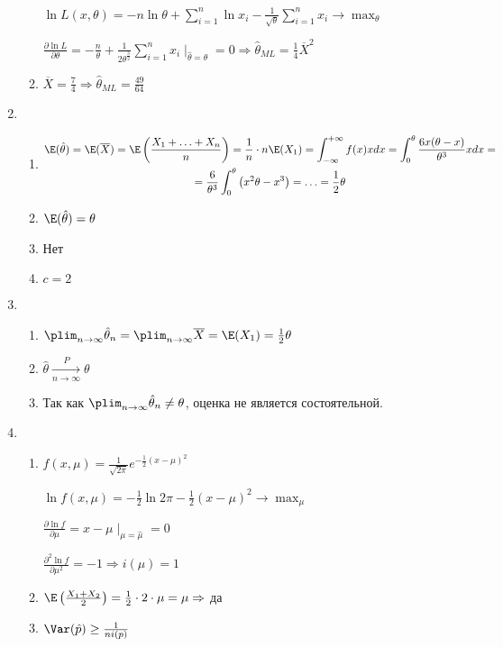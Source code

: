 \begin{enumerate}
\begin{enumerate}
$\ln L(x, \theta) = -n \ln \theta + \sum_{i=1}^n \ln x_i - \frac{1}{\sqrt{\theta}} \sum_{i=1}^n x_i \to \max_\theta $

$\frac{\partial \ln L}{\partial \theta} = -\frac{n}{\theta} + \frac{1}{2\theta^{\frac{3}{2}}} \sum_{i=1}^{n} x_i \mid_{\hat{\theta} = \theta} =0 \Rightarrow \hat{\theta}_{ML} = \frac{1}{4} \overline{X}^2$

\item $\overline{X} = \frac{7}{4} \Rightarrow \hat{\theta}_{ML} = \frac{49}{64}$
\end{enumerate}

\item
\begin{enumerate}
\item
\begin{multline*}
\E(\hat{\theta}) = \E(\overline{X}) = \E \left(\frac{X_1+\ldots+X_n}{n} \right) = \frac{1}{n} \cdot n \E(X_1) = \int_{-\infty}^{+\infty} f(x)x dx = \int_{0}^{\theta} \frac{6x(\theta-x)}{\theta^3} x dx = \\
= \frac{6}{\theta^3} \int_{0}^{\theta} \left( x^2\theta - x^3\right) = \ldots = \frac{1}{2} \theta
\end{multline*}
\item $\E(\hat{\theta}) = \theta$
\item Нет
\item $c=2$
\end{enumerate}

\item
\begin{enumerate}
\item $\plim_{n\to\infty} \hat{\theta}_n = \plim_{n\to\infty} \overline{X} = \E(X_1) = \frac{1}{2}\theta$
\item $\hat{\theta} \underset{n \to \infty}{\overset{P}{\to}} \theta$
\item Так как $\plim_{n\to\infty} \hat{\theta}_n \not= \theta$, оценка не является состоятельной.
\end{enumerate}

\item
\begin{enumerate}
\item $f(x, \mu) =  \frac{1}{\sqrt{2 \pi}} e^{-\frac{1}{2} (x - \mu)^2}$

$\ln f(x, \mu) = -\frac{1}{2} \ln 2\pi -\frac{1}{2}(x - \mu)^2 \to \max_\mu$

$\frac{\partial \ln f}{\partial \mu} = x - \mu \mid_{\mu=\hat{\mu}} =0 $

$\frac{\partial^2 \ln f}{\partial \mu^2} = -1 \Rightarrow i(\mu) = 1$
\item $\E\left(\frac{X_1 + X_2}{2} \right) = \frac{1}{2} \cdot 2 \cdot  \mu = \mu \Rightarrow$ да
\item $\Var(\hat{p}) \geq \frac{1}{ni(p)}$
\end{enumerate}


\end{enumerate}
